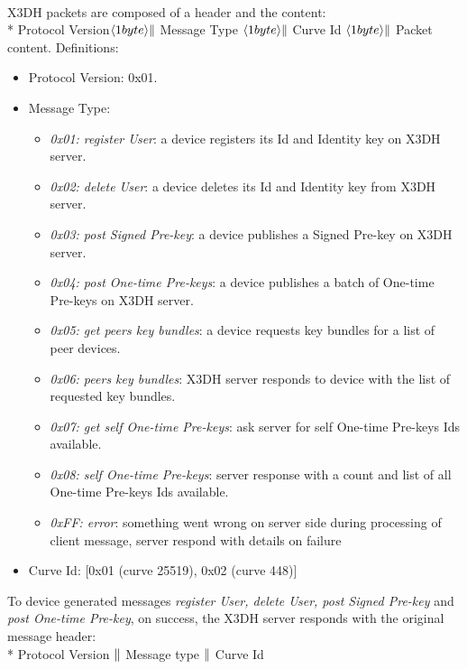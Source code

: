 \documentclass[a4paper,11pt]{article}
\begin{document}
    \paragraph*{}X3DH packets are composed of a header and the content:\\*
    Protocol Version$\langle 1byte\rangle \Arrowvert $ Message Type $\langle 1byte\rangle \Arrowvert $ Curve Id $\langle 1byte\rangle \Arrowvert $ Packet content.
    Definitions:
      \begin{itemize}
      \item Protocol Version: 0x01.
      \item Message Type:
        \begin{itemize}
          \item \textit{0x01: register User}: a device registers its Id and Identity key on X3DH server.
          \item \textit{0x02: delete User}: a device deletes its Id and Identity key from X3DH server.
          \item \textit{0x03: post Signed Pre-key}: a device publishes a Signed Pre-key on X3DH server.
          \item \textit{0x04: post One-time Pre-keys}: a device publishes a batch of One-time Pre-keys on X3DH server.
          \item \textit{0x05: get peers key bundles}: a device requests key bundles for a list of peer devices.
          \item \textit{0x06: peers key bundles}: X3DH server responds to device with the list of requested key bundles.
          \item \textit{0x07: get self One-time Pre-keys}: ask server for self One-time Pre-keys Ids available.
          \item \textit{0x08: self One-time Pre-keys}: server response with a count and list of all One-time Pre-keys Ids available.          
          \item \textit{0xFF: error}: something went wrong on server side during processing of client message, server respond with details on failure
        \end{itemize}
      \item Curve Id: [0x01 (curve 25519), 0x02 (curve 448)]
      \end{itemize}
    
    To device generated messages \textit{register User, delete User, post Signed Pre-key} and \textit{post One-time Pre-key}, on success, the X3DH server responds with the original message header:\\*
    Protocol Version $\Arrowvert $ Message type $\Arrowvert $ Curve Id
\end{document}

